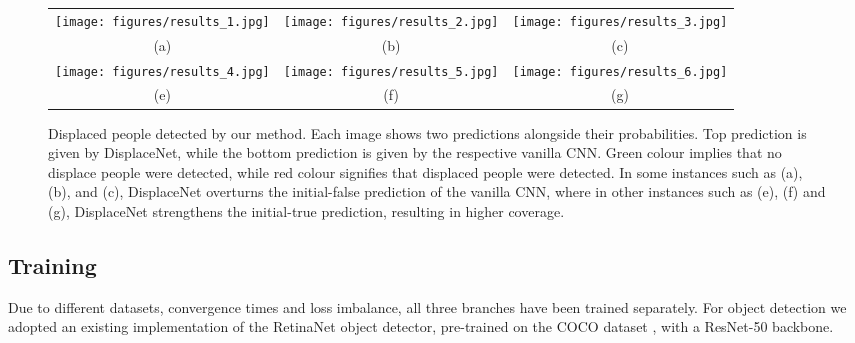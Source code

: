 \documentclass[10pt,twocolumn,letterpaper]{article}
\begin{document}
\begin{figure*}[t!]
	\centering
	\begin{tabular}{ccc}
		\texttt{[image: figures/results\_1.jpg]} &   \texttt{[image: figures/results\_2.jpg]} &
		\texttt{[image: figures/results\_3.jpg]}\\
		(a) & (b)  & (c) \\[-1pt]
		\texttt{[image: figures/results\_4.jpg]} &   \texttt{[image: figures/results\_5.jpg]} &
		\texttt{[image: figures/results\_6.jpg]} \\
		(e) & (f)  & (g)\\[1pt]
	\end{tabular}
	\caption{Displaced people detected by our method. Each image shows two predictions alongside their probabilities. Top prediction is given by DisplaceNet, while the bottom prediction is given by the respective vanilla CNN. Green colour implies that no displace people were detected, while red colour signifies that displaced people were detected. In some instances such as (a), (b), and (c), DisplaceNet overturns the initial-false prediction of the vanilla CNN, where in other instances such as (e), (f) and (g), DisplaceNet strengthens the initial-true prediction, resulting in higher coverage.}
	\label{Fig. 5}
\end{figure*}

\subsection{Training}

Due to different datasets, convergence times and loss imbalance, all three branches have been trained separately. For object detection we adopted an existing implementation of the RetinaNet object detector, pre-trained on the COCO dataset \cite{lin2014microsoft}, with a ResNet-50 backbone. 
\end{document}
